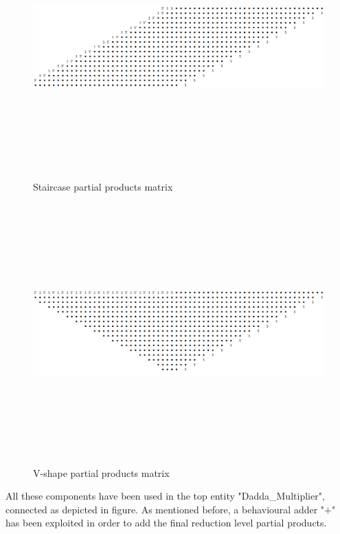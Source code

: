 \begin{figure}[H]
	\centering
	\includegraphics[width=\textwidth , height=10cm]{img/staircase.png} 
	\caption{Staircase partial products matrix}
	\label{Staircase partial products matrix} 
\end{figure}

\begin{figure}[H]
	\centering
	\includegraphics[width=18 cm , height=10cm]{img/vshape.png} 
	\caption{V-shape partial products matrix}
	\label{V-shape partial products matrix} 
\end{figure}

All these components have been used in the top entity "Dadda\_Multiplier", connected as depicted in
figure. As mentioned before, a behavioural adder "$+$" has been exploited in order to add the final
reduction level partial products.

